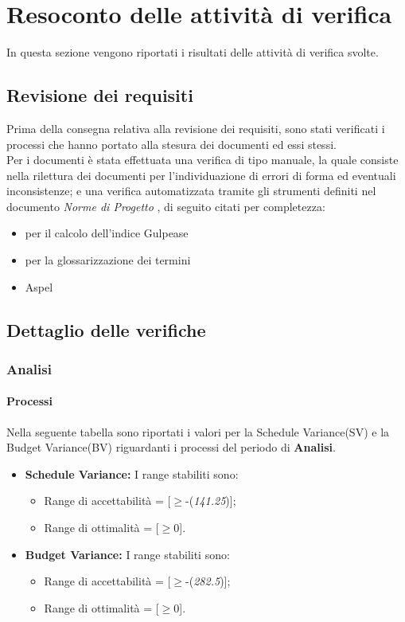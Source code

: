 \section{Resoconto delle attività di verifica}
  In questa sezione vengono riportati i risultati delle attività di verifica svolte.
  \subsection{Revisione dei requisiti}
  Prima della consegna relativa alla revisione dei requisiti, sono stati verificati i processi che hanno portato alla stesura dei documenti ed essi stessi. \\
  Per i documenti è stata effettuata una verifica di tipo manuale, la quale consiste nella rilettura dei documenti per l'individuazione di errori di forma ed eventuali inconsistenze;
  e una verifica automatizzata tramite gli strumenti definiti nel documento \emph{Norme di Progetto \VersioneNP{}}, di seguito citati per completezza:
  \begin{itemize}
    \item {}  per il calcolo dell’indice Gulpease
    \item {}  per la glossarizzazione dei termini
    \item Aspel
  \end{itemize}
  \subsection{Dettaglio delle verifiche}
    \subsubsection{Analisi}
      \paragraph{Processi}
      Nella seguente tabella sono riportati i valori per la Schedule Variance(SV) e la Budget Variance(BV) riguardanti i processi del periodo di \textbf{Analisi}.\\
      \begin{itemize}
      \item \textbf{Schedule Variance:} I range stabiliti sono:
      \begin{itemize}
        \item Range di accettabilità = [\(\geq\)-(\emph{141.25})];
        \item Range di ottimalità = [\(\geq\)0].
      \end{itemize}
      
      \item \textbf{Budget Variance:} I range stabiliti sono:
      \begin{itemize}
        \item Range di accettabilità = [\(\geq\)-(\emph{282.5})];
        \item Range di ottimalità = [\(\geq\)0].
      \end{itemize}
      
      
      \end{itemize}
     
